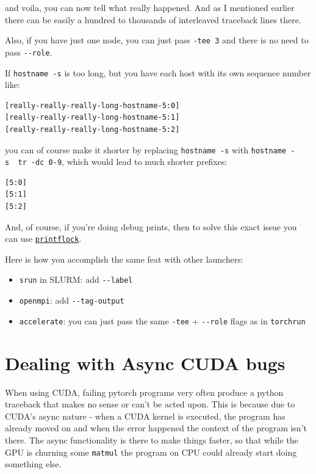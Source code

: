 \documentclass[
]{report}
\providecommand{\tightlist}{%
  \setlength{\itemsep}{0pt}\setlength{\parskip}{0pt}}\usepackage{longtable,booktabs,array}
\begin{document}
and voila, you can now tell what really happened. And as I mentioned
earlier there can be easily a hundred to thousands of interleaved
traceback lines there.

Also, if you have just one node, you can just pass \texttt{-tee\ 3} and
there is no need to pass \texttt{-\/-role}.

If \texttt{hostname\ -s} is too long, but you have each host with its
own sequence number like:

\begin{verbatim}
[really-really-really-long-hostname-5:0]
[really-really-really-long-hostname-5:1]
[really-really-really-long-hostname-5:2]
\end{verbatim}

you can of course make it shorter by replacing \texttt{hostname\ -s}
with
\texttt{hostname\ -s\ \textbar{}\ tr\ -dc\ \textquotesingle{}0-9\textquotesingle{}},
which would lead to much shorter prefixes:

\begin{verbatim}
[5:0]
[5:1]
[5:2]
\end{verbatim}

And, of course, if you're doing debug prints, then to solve this exact
issue you can use
\href{./torch-distributed-hanging-solutions.md\#good-old-print}{\texttt{printflock}}.

Here is how you accomplish the same feat with other launchers:

\begin{itemize}
\tightlist
\item
  \texttt{srun} in SLURM: add \texttt{-\/-label}
\item
  \texttt{openmpi}: add \texttt{-\/-tag-output}
\item
  \texttt{accelerate}: you can just pass the same \texttt{-tee} +
  \texttt{-\/-role} flags as in \texttt{torchrun}
\end{itemize}

\section{Dealing with Async CUDA
bugs}\label{dealing-with-async-cuda-bugs}

When using CUDA, failing pytorch programs very often produce a python
traceback that makes no sense or can't be acted upon. This is because
due to CUDA's async nature - when a CUDA kernel is executed, the program
has already moved on and when the error happened the context of the
program isn't there. The async functionality is there to make things
faster, so that while the GPU is churning some \texttt{matmul} the
program on CPU could already start doing something else.
\end{document}
